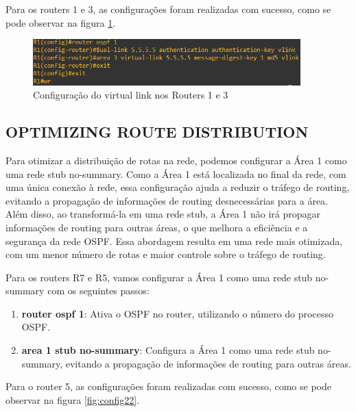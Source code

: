 \documentclass[11pt,english, openright, oneside]{book}
\begin{document}
Para os routers 1 e 3, as configurações foram realizadas com sucesso, como se pode observar na figura \ref{fig:config21}.
\vspace{0.2cm}

\begin{figure}[H]
    \centering
    \includegraphics[width=0.92\textwidth]{imagens/Tarefa3/13.virtual_link_R1.png}
    \caption{Configuração do virtual link nos Routers 1 e 3}
    \label{fig:config21}
\end{figure}
\vspace{0.2cm}

\newpage 
\subsection{OPTIMIZING ROUTE DISTRIBUTION}
\vspace{0.2cm}

Para otimizar a distribuição de rotas na rede, podemos configurar a Área 1 como uma rede stub no-summary. Como a Área 1 está localizada no final da rede, com uma única conexão à rede, essa configuração ajuda a reduzir o tráfego de routing, evitando a propagação de informações de routing desnecessárias para a área. Além disso, ao transformá-la em uma rede stub, a Área 1 não irá propagar informações de routing para outras áreas, o que melhora a eficiência e a segurança da rede OSPF. Essa abordagem resulta em uma rede mais otimizada, com um menor número de rotas e maior controle sobre o tráfego de routing.
\vspace{0.2cm}

Para os routers R7 e R5, vamos configurar a Área 1 como uma rede stub no-summary com os seguintes passos:

\begin{enumerate}
  \item \textbf{router ospf 1}: Ativa o OSPF no router, utilizando o número do processo OSPF.
  \item \textbf{area 1 stub no-summary}: Configura a Área 1 como uma rede stub no-summary, evitando a propagação de informações de routing para outras áreas.
\end{enumerate}
\vspace{0.2cm}

Para o router 5, as configurações foram realizadas com sucesso, como se pode observar na figura \ref{fig:config22}.
\vspace{0.2cm}
\end{document}
